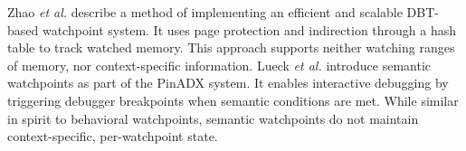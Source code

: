 \documentclass[letterpaper,twocolumn,10pt]{article}
\begin{document}


Zhao \emph{et al.} \cite{DynamoRIOWatchpoints} describe a method of implementing an efficient and scalable DBT-based watchpoint system. It uses page protection and indirection through a hash table to track watched memory. This approach supports neither watching ranges of memory, nor context-specific information. Lueck \emph{et al.} \cite{PinADX} introduce semantic watchpoints as part of the PinADX system. %
It enables interactive debugging by triggering debugger breakpoints when semantic conditions are met. While similar in spirit to behavioral watchpoints, semantic watchpoints do not maintain context-specific, per-watchpoint state. 

\end{document}

